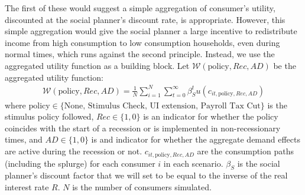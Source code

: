 \documentclass[../HAFiscal]{subfiles}
\begin{document}
The first of these would suggest a simple aggregation of consumer's utility, discounted at the social planner's discount rate, is appropriate. However, this simple aggregation would give the social planner a large incentive to redistribute income from high consumption to low consumption households, even during normal times, which runs against the second principle. Instead, we use the aggregated utility function as a building block. Let  $\mathcal{W}(\text{policy},Rec,AD)$ be the aggregated utility function:
\begin{align}
	\mathcal{W}(\text{policy},Rec,AD) =\frac{1}{N}\sum_{i=1}^{N} \sum_{t=0}^{\infty} \beta_S^t u(c_{it,\text{policy},Rec,AD}) 
\end{align}
where $\text{policy}\in \{\text{None, Stimulus Check, UI extension, Payroll Tax Cut}\}$ is the stimulus policy followed, $Rec\in\{1,0\}$ is an indicator for whether the policy coincides with the start of a recession or is implemented in non-recessionary times, and $AD\in\{1,0\}$ is and indicator for whether the aggregate demand effects are active during the recession or not. $c_{it,\text{policy},Rec,AD}$ are the consumption paths (including the splurge) for each consumer $i$ in each scenario. $\beta_S$ is the social planner's discount factor that we will set to be equal to the inverse of the real interest rate $R$. $N$ is the number of consumers simulated.
\end{document}
